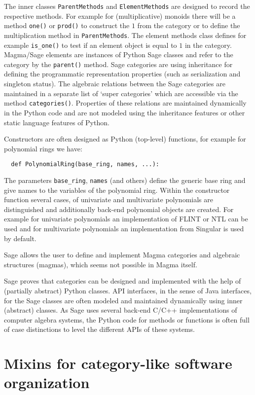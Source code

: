 \documentclass{llncs}
\newcommand{\code}[1]{\texttt{#1}}
\begin{document}
The inner classes \code{ParentMethods} and \code{ElementMethods} are
designed to re\-cord the respective methods. For example for
(multiplicative) monoids there will be a method \code{one()} or
\code{prod()} to construct the $1$ from the category or to define the
multiplication method in \code{ParentMethods}. The element methods
class defines for example \code{is\_one()} to test if an element object
is equal to $1$ in the category.
%
Magma/Sage elements are instances of Python Sage classes and refer to
the category by the \code{parent()} method. Sage categories are using
inheritance for defining the programmatic representation properties
(such as serialization and singleton status).  The algebraic relations
between the Sage categories are maintained in a separate list of
`super categories' which are accessible via the method
\code{categories()}.  Properties of these relations are maintained
dynamically in the Python code and are not modeled using the
inheritance features or other static language features of Python.

Constructors are often designed as Python (top-level) functions, for
example for polynomial rings we have:
\begin{verbatim}
  def PolynomialRing(base_ring, names, ...):
\end{verbatim}
The parameters \code{base\_ring}, \code{names} (and others) define the
generic base ring and give names to the variables of the
polynomial ring.  Within the constructor function several cases, of
univariate and multivariate polynomials are distinguished and
additionally back-end polynomial objects are created. For example for
univariate polynomials an implementation of FLINT or NTL can be used
and for multivariate polynomials an implementation from Singular is
used by default.

Sage allows the user to define and implement Magma categories and
algebraic structures (magmas), which seems not possible in Magma itself.

Sage proves that categories can be designed and implemented with the
help of (partially abstract) Python classes. API interfaces, in the
sense of Java interfaces, for the Sage classes are often modeled and
maintained dynamically using inner (abstract) classes. As Sage uses
several back-end C/C++ implementations of computer algebra systems, the
Python code for methods or functions is often full of case distinctions
to level the different APIs of these systems.


\section{Mixins for category-like software organization} %
\label{sec:mixin}
\end{document}
